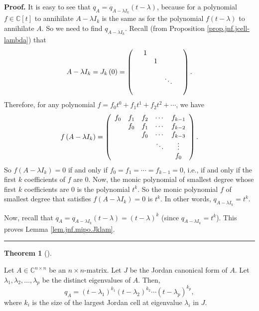 \documentclass[numbers=enddot,12pt,final,onecolumn,notitlepage]{scrartcl}%
\numberwithin{exer}{subsection}
\theoremstyle{definition}
\newtheorem{theo}{Theorem}[subsection]
\newenvironment{theorem}[1][]
{\begin{theo}[#1]\begin{leftbar}}
{\end{leftbar}\end{theo}}
\newenvironment{proof}[1][Proof]{\noindent\textbf{#1.} }{\ \rule{0.5em}{0.5em}}
\begin{document}
\begin{proof}
It is easy to see that $q_{A}=q_{A-\lambda I_{k}}\left(  t-\lambda\right)  $,
because for a polynomial $f\in\mathbb{C}\left[  t\right]  $ to annihilate
$A-\lambda I_{k}$ is the same as for the polynomial $f\left(  t-\lambda
\right)  $ to annihilate $A$. So we need to find $q_{A-\lambda I_{k}}$. Recall
(from Proposition \ref{prop.jnf.jcell-lambda}) that
\[
A-\lambda I_{k}=J_{k}\left(  0\right)  =\left(
\begin{array}
[c]{ccccc}
& 1 &  &  & \\
&  & 1 &  & \\
&  &  &  & \\
&  &  & \ddots & \\
&  &  &  &
\end{array}
\right)  .
\]
Therefore, for any polynomial $f=f_{0}t^{0}+f_{1}t^{1}+f_{2}t^{2}+\cdots$, we
have%
\[
f\left(  A-\lambda I_{k}\right)  =\left(
\begin{array}
[c]{ccccc}%
f_{0} & f_{1} & f_{2} & \cdots & f_{k-1}\\
& f_{0} & f_{1} & \cdots & f_{k-2}\\
&  & f_{0} & \cdots & f_{k-3}\\
&  &  & \ddots & \vdots\\
&  &  &  & f_{0}%
\end{array}
\right)  .
\]
So $f\left(  A-\lambda I_{k}\right)  =0$ if and only if $f_{0}=f_{1}%
=\cdots=f_{k-1}=0$, i.e., if and only if the first $k$ coefficients of $f$ are
$0$. Now, the monic polynomial of smallest degree whose first $k$ coefficients
are $0$ is the polynomial $t^{k}$. So the monic polynomial $f$ of smallest
degree that satisfies $f\left(  A-\lambda I_{k}\right)  =0$ is $t^{k}$. In
other words, $q_{A-\lambda I_{k}}=t^{k}$.

Now, recall that $q_{A}=q_{A-\lambda I_{k}}\left(  t-\lambda\right)  =\left(
t-\lambda\right)  ^{k}$ (since $q_{A-\lambda I_{k}}=t^{k}$). This proves Lemma
\ref{lem.jnf.mipo.Jklam}.
\end{proof}

\begin{theorem}
\label{thm.jnf.mipo.jnf}Let $A\in\mathbb{C}^{n\times n}$ be an $n\times
n$-matrix. Let $J$ be the Jordan canonical form of $A$. Let $\lambda
_{1},\lambda_{2},\ldots,\lambda_{p}$ be the distinct eigenvalues of $A$. Then,%
\[
q_{A}=\left(  t-\lambda_{1}\right)  ^{k_{1}}\left(  t-\lambda_{2}\right)
^{k_{2}}\cdots\left(  t-\lambda_{p}\right)  ^{k_{p}},
\]
where $k_{i}$ is the size of the largest Jordan cell at eigenvalue
$\lambda_{i}$ in $J$.
\end{theorem}
\end{document}
